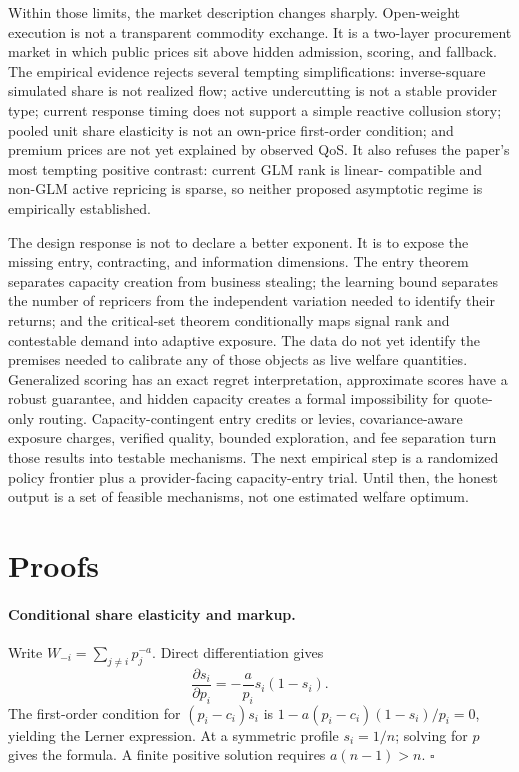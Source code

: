 \documentclass[sigconf,nonacm]{acmart}
\newcommand{\1}{\mathbf 1}
\begin{document}
Within those limits, the market description changes sharply.  Open-weight
execution is not a transparent commodity exchange.  It is a two-layer
procurement market in which public prices sit above hidden admission, scoring,
and fallback.  The empirical evidence rejects several tempting simplifications:
inverse-square simulated share is not realized flow; active undercutting is not a
stable provider type; current response timing does not support a simple reactive
collusion story; pooled unit share elasticity is not an own-price first-order
condition; and premium prices are not yet explained by observed QoS.  It also
refuses the paper's most tempting positive contrast: current GLM rank is linear-
compatible and non-GLM active repricing is sparse, so neither proposed asymptotic
regime is empirically established.

The design response is not to declare a better exponent.  It is to expose the
missing entry, contracting, and information dimensions.  The entry theorem
separates capacity creation from business stealing; the learning bound separates
the number of repricers from the independent variation needed to identify their
returns; and the critical-set theorem conditionally maps signal rank and
contestable demand into adaptive exposure.  The data do not yet identify the
premises needed to calibrate any of those objects as live welfare quantities.
Generalized scoring has an exact regret interpretation, approximate scores have
a robust guarantee, and hidden capacity creates a formal impossibility for
quote-only routing.  Capacity-contingent entry credits or levies,
covariance-aware exposure charges, verified quality, bounded exploration, and
fee separation turn those results into testable mechanisms.  The next empirical
step is a randomized policy frontier plus a provider-facing capacity-entry trial.
Until then, the honest output is a set of feasible mechanisms, not one estimated
welfare optimum.

\appendix

\section{Proofs}

\paragraph{Conditional share elasticity and markup.}
Write $W_{-i}=\sum_{j\ne i}p_j^{-a}$.  Direct differentiation gives
\[
\frac{\partial s_i}{\partial p_i}
=-\frac{a}{p_i}s_i(1-s_i).
\]
The first-order condition for $(p_i-c_i)s_i$ is
$1-a(p_i-c_i)(1-s_i)/p_i=0$, yielding the Lerner expression.  At a
symmetric profile $s_i=1/n$; solving for $p$ gives the formula.  A finite positive
solution requires $a(n-1)>n$. \hfill$\square$
\end{document}

